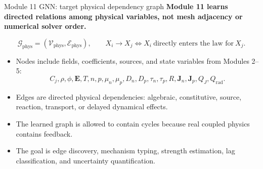 \documentclass[aspectratio=169,10pt]{beamer}
\begin{document}
\begin{frame}{Module 11 GNN: target physical dependency graph}
\small
\textbf{Module 11 learns directed relations among physical variables, not mesh adjacency or numerical solver order.}

\vspace{0.25em}
\begin{equation*}
\boxed{
\mathcal G_{\mathrm{phys}}=(\mathcal V_{\mathrm{phys}},\mathcal E_{\mathrm{phys}}),
\qquad
X_i\rightarrow X_j
\Longleftrightarrow
X_i\ \text{directly enters the law for}\ X_j.
}
\end{equation*}

\vspace{-0.1em}
\begin{itemize}
    \item Nodes include fields, coefficients, sources, and state variables from Modules 2--5:
    \[
        C_j,\rho,\phi,\mathbf E,T,n,p,\mu_n,\mu_p,D_n,D_p,\tau_n,\tau_p,R,\mathbf J_n,\mathbf J_p,Q_J,Q_{\mathrm{rad}}.
    \]
    \item Edges are directed physical dependencies: algebraic, constitutive, source, reaction, transport, or delayed dynamical effects.
    \item The learned graph is allowed to contain cycles because real coupled physics contains feedback.
    \item The goal is edge discovery, mechanism typing, strength estimation, lag classification, and uncertainty quantification.
\end{itemize}
\end{frame}
\end{document}
